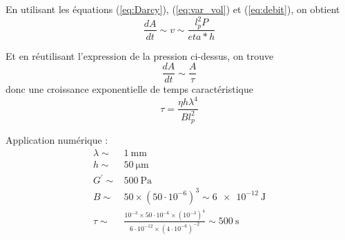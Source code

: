 \documentclass[12pt,a4paper]{article}
\begin{document}
En utilisant les équations (\ref{eq:Darcy}), (\ref{eq:var_vol}) et (\ref{eq:debit}), on obtient
\begin{equation}
\frac{dA}{dt} \sim v \sim \frac{l_p^2  P}{eta * h}
\end{equation}

Et en réutilisant l'expression de la pression ci-dessus, on trouve
\begin{equation}
\frac{dA}{dt} \sim \frac{A}{\tau}
\end{equation}
donc une croissance exponentielle de temps caractéristique
\begin{equation}
\tau = \frac{\eta h  \lambda^4} {B l_p^2}
\end{equation}

Application numérique :
\begin{align}
\lambda \sim & \SI{1}{\milli\metre}\\
h \sim & \SI{50}{\micro\metre}\\
G^\prime \sim & \SI{500}{\pascal}\\
B \sim & 50 \times (50\cdot 10^{-6})^3 \sim \SI{6e-12}{\joule}\\
\tau \sim & \frac{10^{-3} \times 50\cdot 10^{-6} \times (10^{-3})^4}{6 \cdot 10^{-12} \times (4 \cdot 10^{-6})^{-2}} \sim \SI{500}{\second}
\end{align}
\end{document}
